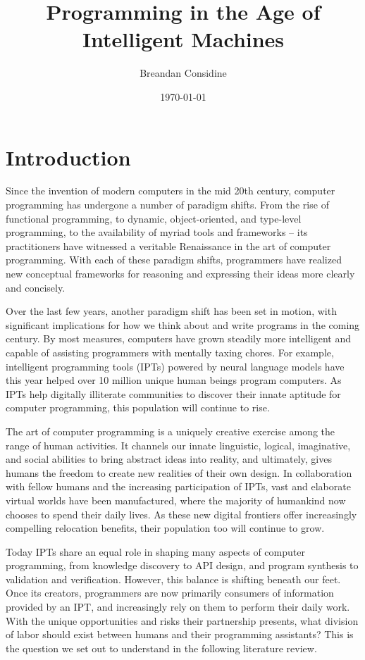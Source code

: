 \documentclass[10pt]{article}
\title{Programming in the Age of Intelligent Machines}
\author{Breandan Considine}
\date{\today}
\begin{document}
  \maketitle
  \section{Introduction}

Since the invention of modern computers in the mid 20th century, computer programming has undergone a number of paradigm shifts. From the rise of functional programming, to dynamic, object-oriented, and type-level programming, to the availability of myriad tools and frameworks -- its practitioners have witnessed a veritable Renaissance in the art of computer programming. With each of these paradigm shifts, programmers have realized new conceptual frameworks for reasoning and expressing their ideas more clearly and concisely.

Over the last few years, another paradigm shift has been set in motion, with significant implications for how we think about and write programs in the coming century. By most measures, computers have grown steadily more intelligent and capable of assisting programmers with mentally taxing chores. For example, intelligent programming tools (IPTs) powered by neural language models have this year helped over 10 million unique human beings program computers. As IPTs help digitally illiterate communities to discover their innate aptitude for computer programming, this population will continue to rise.

The art of computer programming is a uniquely creative exercise among the range of human activities. It channels our innate linguistic, logical, imaginative, and social abilities to bring abstract ideas into reality, and ultimately, gives humans the freedom to create new realities of their own design. In collaboration with fellow humans and the increasing participation of IPTs, vast and elaborate virtual worlds have been manufactured, where the majority of humankind now chooses to spend their daily lives. As these new digital frontiers offer increasingly compelling relocation benefits, their population too will continue to grow.

Today IPTs share an equal role in shaping many aspects of computer programming, from knowledge discovery to API design, and program synthesis to validation and verification. However, this balance is shifting beneath our feet. Once its creators, programmers are now primarily consumers of information provided by an IPT, and increasingly rely on them to perform their daily work. With the unique opportunities and risks their partnership presents, what division of labor should exist between humans and their programming assistants? This is the question we set out to understand in the following literature review.
\end{document}
